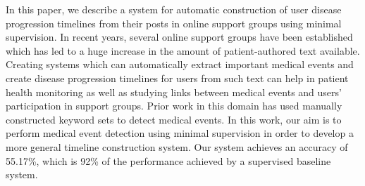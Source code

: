 In this paper, we describe a system for automatic construction of user disease progression timelines from their posts in online support groups using minimal supervision. In recent years, several online support groups have been established which has led to a huge increase in the amount of patient-authored text available. Creating systems which can automatically extract important medical events and create disease progression timelines for users from such text can help in patient health monitoring as well as studying links between medical events and users' participation in support groups. Prior work in this domain has used manually constructed keyword sets to detect medical events. In this work, our aim is to perform medical event detection using minimal supervision in order to develop a more general timeline construction system. Our system achieves an accuracy of 55.17\%, which is 92\% of the performance achieved by a supervised baseline system.
